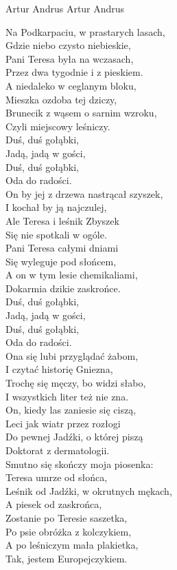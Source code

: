 {Artur Andrus}
{Artur Andrus}
\begin{text}
Na Podkarpaciu, w prastarych lasach,\\
Gdzie niebo czysto niebieskie,\\
Pani Teresa była na wczasach,\\
Przez dwa tygodnie i z pieskiem.\\
A niedaleko w ceglanym bloku,\\
Mieszka ozdoba tej dziczy,\\
Brunecik z wąsem o sarnim wzroku,\\
Czyli miejscowy leśniczy.\\

Duś, duś gołąbki,\\
Jadą, jadą w gości,\\
Duś, duś gołąbki,\\
Oda do radości.\\

On by jej z drzewa nastrącał szyszek,\\
I kochał by ją najczulej,\\
Ale Teresa i leśnik Zbyszek\\
Się nie spotkali w ogóle.\\
Pani Teresa całymi dniami\\
Się wyleguje pod słońcem,\\
A on w tym lesie chemikaliami,\\
Dokarmia dzikie zaskrońce.\\

Duś, duś gołąbki,\\
Jadą, jadą w gości,\\
Duś, duś gołąbki,\\
Oda do radości.\\

Ona się lubi przyglądać żabom,\\
I czytać historię Gniezna,\\
Trochę się męczy, bo widzi słabo,\\
I wszystkich liter też nie zna.\\
On, kiedy las zaniesie się ciszą,\\
Leci jak wiatr przez rozłogi\\
Do pewnej Jadźki, o której piszą\\
Doktorat z dermatologii.\\

Smutno się skończy moja piosenka:\\
Teresa umrze od słońca,\\
Leśnik od Jadźki, w okrutnych mękach,\\
A piesek od zaskrońca,\\
Zostanie po Teresie saszetka,\\
Po psie obróżka z kolczykiem,\\
A po leśniczym mała plakietka,\\
Tak, jestem Europejczykiem.\\


\end{text}
